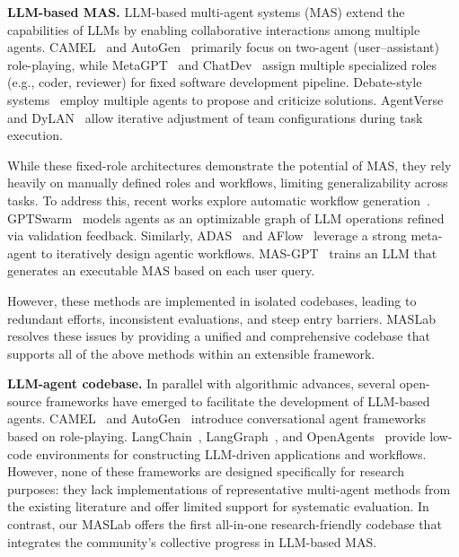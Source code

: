 \documentclass{article}
\begin{document}
\textbf{LLM-based MAS.}
LLM-based multi-agent systems (MAS) extend the capabilities of LLMs by enabling collaborative interactions among multiple agents.
CAMEL~\cite{li2023camel} and AutoGen~\cite{wu2024autogen} primarily focus on two-agent (user–assistant) role-playing, while MetaGPT~\cite{hongmetagpt} and ChatDev~\cite{qian2024chatdev} assign multiple specialized roles (e.g., coder, reviewer) for fixed software development pipeline.
Debate-style systems~\cite{debate1,debate2,subramaniam2025multiagent} employ multiple agents to propose and criticize solutions. 
AgentVerse~\cite{chen2023agentverse} and DyLAN~\cite{dylan} allow iterative adjustment of team configurations during task execution.

While these fixed-role architectures demonstrate the potential of MAS, they rely heavily on manually defined roles and workflows, limiting generalizability across tasks.
To address this, recent works explore automatic workflow generation~\cite{masgpt,adas,gdesigner,agentprune,zhang2025gnns}.
GPTSwarm~\cite{zhugegptswarm} models agents as an optimizable graph of LLM operations refined via validation feedback.
Similarly, ADAS~\cite{adas} and AFlow~\cite{aflow} leverage a strong meta-agent to iteratively design agentic workflows.
MAS-GPT~\cite{masgpt} trains an LLM that generates an executable MAS based on each user query.

However, these methods are implemented in isolated codebases, leading to redundant efforts, inconsistent evaluations, and steep entry barriers. 
MASLab resolves these issues by providing a unified and comprehensive codebase that supports all of the above methods within an extensible framework.

\textbf{LLM-agent codebase.}
In parallel with algorithmic advances, several open-source frameworks have emerged to facilitate the development of LLM-based agents.
CAMEL~\cite{li2023camel} and AutoGen~\cite{wu2024autogen} introduce conversational agent frameworks based on role-playing.
LangChain~\cite{langchain}, LangGraph~\cite{langgraph}, and OpenAgents~\cite{xie2024openagents} provide low-code environments for constructing LLM-driven applications and workflows.
However, none of these frameworks are designed specifically for research purposes: they lack implementations of representative multi-agent methods from the existing literature and offer limited support for systematic evaluation.
In contrast, our MASLab offers the first all-in-one research-friendly codebase that integrates the community’s collective progress in LLM-based MAS.
\end{document}
